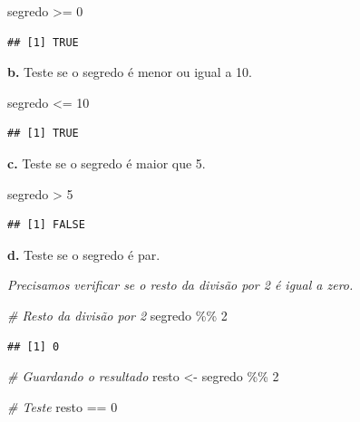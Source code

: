\documentclass[
]{book}
\newenvironment{Shaded}{\begin{snugshade}}{\end{snugshade}}
\newcommand{\CommentTok}[1]{\textcolor[rgb]{0.56,0.35,0.01}{\textit{#1}}}
\newcommand{\DecValTok}[1]{\textcolor[rgb]{0.00,0.00,0.81}{#1}}
\newcommand{\NormalTok}[1]{#1}
\newcommand{\OtherTok}[1]{\textcolor[rgb]{0.56,0.35,0.01}{#1}}
\newcommand{\SpecialCharTok}[1]{\textcolor[rgb]{0.00,0.00,0.00}{#1}}
\begin{document}
\begin{Shaded}
\begin{Highlighting}[]
\NormalTok{segredo }\SpecialCharTok{\textgreater{}=} \DecValTok{0}
\end{Highlighting}
\end{Shaded}

\begin{verbatim}
## [1] TRUE
\end{verbatim}

\textbf{b.} Teste se o segredo é menor ou igual a 10.

\begin{Shaded}
\begin{Highlighting}[]
\NormalTok{segredo }\SpecialCharTok{\textless{}=} \DecValTok{10}
\end{Highlighting}
\end{Shaded}

\begin{verbatim}
## [1] TRUE
\end{verbatim}

\textbf{c.} Teste se o segredo é maior que 5.

\begin{Shaded}
\begin{Highlighting}[]
\NormalTok{segredo }\SpecialCharTok{\textgreater{}} \DecValTok{5}
\end{Highlighting}
\end{Shaded}

\begin{verbatim}
## [1] FALSE
\end{verbatim}

\textbf{d.} Teste se o segredo é par.

\emph{Precisamos verificar se o resto da divisão por 2 é igual a zero.}

\begin{Shaded}
\begin{Highlighting}[]
\CommentTok{\# Resto da divisão por 2}
\NormalTok{segredo }\SpecialCharTok{\%\%} \DecValTok{2}
\end{Highlighting}
\end{Shaded}

\begin{verbatim}
## [1] 0
\end{verbatim}

\begin{Shaded}
\begin{Highlighting}[]
\CommentTok{\# Guardando o resultado}
\NormalTok{resto }\OtherTok{\textless{}{-}}\NormalTok{ segredo }\SpecialCharTok{\%\%} \DecValTok{2}

\CommentTok{\# Teste}
\NormalTok{resto }\SpecialCharTok{==} \DecValTok{0}
\end{Highlighting}
\end{Shaded}
\end{document}
